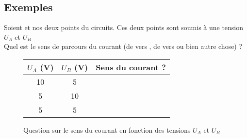 \subsection{Exemples}
\begin{question}
Soient \A et \B nos deux points du circuits. Ces deux points sont soumis à une tension $U_A$ et $U_B$\\
Quel est le sens de parcours du courant (de \A vers \B, de \B vers \A ou bien autre chose) ?

\begin{figure}[!h]
    \centering
\begin{tabular}{|c|c|c|}
    \hline
    $U_A$ (V) & $U_B$ (V) & Sens du courant ?\\
    \hline
    10 & 5 & \\
    \hline
    5 & 10 & \\
    \hline
    5 & 5 &\\
    \hline
\end{tabular}
\caption{Question sur le sens du courant en fonction des tensions $U_A$ et $U_B$}
\end{figure}
\end{question}

